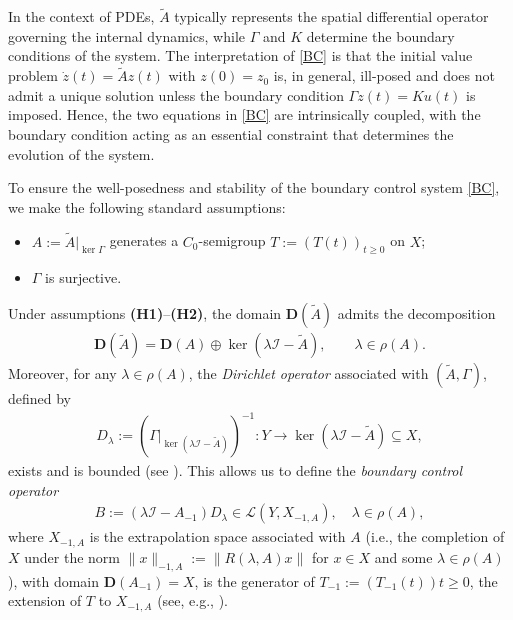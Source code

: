 \documentclass[onecolumn]{autart}
\def\la{\lambda}
\numberwithin{equation}{section}
\begin{document}
   In the context of PDEs, $\tilde{A}$ typically represents the spatial differential operator governing the internal dynamics, while $\Gamma$ and $K$ determine the boundary conditions of the system. The interpretation of \eqref{BC} is that the initial value problem $\dot{z}(t) = \tilde{A}z(t)$ with $z(0) = z_0$ is, in general, ill-posed and does not admit a unique solution unless the boundary condition $\Gamma z(t) = K u(t)$ is imposed. Hence, the two equations in \eqref{BC} are intrinsically coupled, with the boundary condition acting as an essential constraint that determines the evolution of the system.
	

  To ensure the well-posedness and stability of the boundary control system \eqref{BC}, we make the following standard assumptions:
	\begin{itemize}
		\item[{\bf (H1)}] $A:= \tilde{A}\vert_{\ker \Gamma}$ generates a $C_0$-semigroup $T:= (T(t))_{t\ge 0}$ on $X$;
		\item[{\bf (H2)}] $\Gamma$ is surjective.
	\end{itemize}
	
	Under assumptions {\bf (H1)}--{\bf (H2)}, the domain ${\bm D}(\tilde{A})$ admits the decomposition
	\begin{align}\label{decomposition}
		{\bm D}(\tilde{A})={\bm D}(A) \oplus \ker(\lambda \mathcal{I}- \tilde{A}),\qquad \lambda\in \rho(A).
	\end{align}
	Moreover, for any $\lambda \in \rho(A)$, the \emph{Dirichlet operator} associated with $(\tilde{A},\Gamma)$, defined by
	\begin{align}\label{Dirichlet}
		D_\lambda := (\Gamma|_{\ker(\lambda \mathcal{I}-\tilde{A})})^{-1} : Y \to \ker(\lambda \mathcal{I}-\tilde{A}) \subseteq X,
	\end{align}
	exists and is bounded (see \cite[Lems. 1.2 and 1.3]{Gr}). This allows us to define the \emph{boundary control operator}
	\begin{align}\label{boundary-control}
		B:=(\lambda \mathcal{I}-A_{-1})D_\lambda \in \mathcal{L}(Y,X_{-1,A}),\quad \lambda \in \rho(A),
	\end{align}
     where $X_{-1,A}$ is the extrapolation space associated with $A$ (i.e., the completion of $X$ under the norm $\|x\|_{-1,A}:=\|R(\la,A)x\|$ for $x\in  X$ and some $\lambda\in \rho(A)$), with domain $\bm{D}(A_{-1}) = X$, is the generator of $T_{-1} := (T_{-1}(t)){t \ge 0}$, the extension of $T$ to $X_{-1,A}$ (see, e.g., \cite[Sect.~II.5]{EN}).
\end{document}
